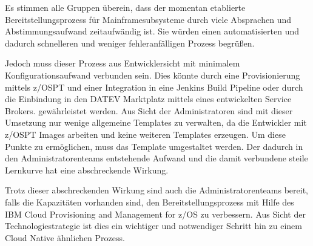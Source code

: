 Es stimmen alle Gruppen überein, dass der momentan etablierte Bereitstellungsprozess für Mainframesubsysteme durch viele Absprachen und Abstimmungsaufwand zeitaufwändig ist.
Sie würden einen automatisierten und dadurch schnelleren und weniger fehleranfälligen Prozess begrüßen.

Jedoch muss dieser Prozess aus Entwicklersicht mit minimalem Konfigurationsaufwand verbunden sein.
Dies könnte durch eine Provisionierung mittels z/OSPT und einer  Integration in eine Jenkins Build Pipeline oder durch die Einbindung in den \glqq DATEV Marktplatz\grqq{} mittels eines entwickelten \glqq Service Brokers\grqq. gewährleistet werden.
Aus Sicht der Administratoren sind mit dieser Umsetzung nur wenige allgemeine Templates zu verwalten, da die Entwickler mit z/OSPT Images arbeiten und keine weiteren Templates erzeugen.
Um diese Punkte zu ermöglichen, muss das Template umgestaltet werden.
Der dadurch in den Administratorenteams entstehende Aufwand und die damit verbundene steile Lernkurve hat eine abschreckende Wirkung.

Trotz dieser abschreckenden Wirkung sind auch die Administratorenteams bereit, falls die Kapazitäten vorhanden sind, den Bereitstellungsprozess mit Hilfe des \glqq IBM Cloud Provisioning and Management for z/OS\grqq{} zu verbessern.
Aus Sicht der Technologiestrategie ist dies ein wichtiger und notwendiger Schritt hin zu einem Cloud Native ähnlichen Prozess.
